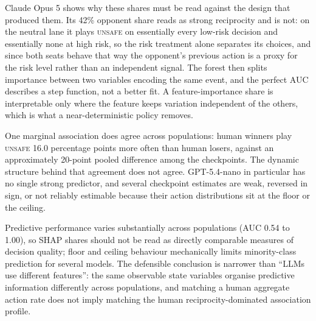 \documentclass[sigconf,anonymous]{aamas}
\newcommand{\Safe}{\textsc{safe}}
\newcommand{\Unsafe}{\textsc{unsafe}}
\begin{document}
Claude Opus 5 shows why these shares must be read against the design that
produced them. Its 42\% opponent share reads as strong reciprocity and is
not: on the neutral lane it plays \Unsafe{} on essentially every low-risk
decision and essentially none at high risk, so the risk treatment alone
separates its choices, and since both seats behave that way the opponent's
previous action is a proxy for the risk level rather than an independent
signal. The forest then splits importance between two variables encoding
the same event, and the perfect AUC describes a step function, not a better
fit. A feature-importance share is interpretable only where the feature
keeps variation independent of the others, which is what a
near-deterministic policy removes.

One marginal association does agree across populations: human winners
play \Unsafe{} 16.0 percentage points more often than human losers, against an
approximately 20-point pooled difference among the checkpoints. The dynamic
structure behind that agreement does not agree. GPT-5.4-nano in particular has
no single strong predictor, and several checkpoint estimates are weak,
reversed in sign, or not reliably estimable because their action distributions
sit at the floor or the ceiling.

Predictive performance varies substantially across populations (AUC 0.54
to 1.00), so SHAP shares should not be read as directly comparable measures
of decision quality; floor and ceiling behaviour mechanically limits
minority-class prediction for several models. The defensible
conclusion is narrower than ``LLMs use different features'': the same
observable state variables organise predictive information differently
across populations, and matching a human aggregate action rate does not
imply matching the human reciprocity-dominated association profile.



\end{document}
